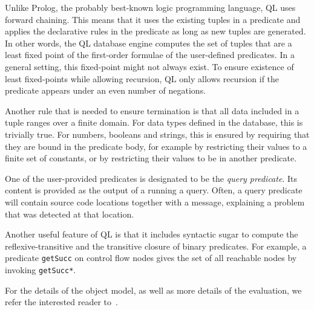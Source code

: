 Unlike Prolog, the probably best-known logic programming language, QL uses forward 
chaining.
This means that it uses the existing tuples in a predicate and applies the declarative
rules in the predicate as long as new tuples are generated.
In other words, the QL database engine computes the set of tuples that are a least fixed point 
of the first-order formulae of the user-defined predicates.
In a general setting, this fixed-point might not always exist.
To ensure existence of least fixed-points while allowing recursion,
QL only allows recursion if the predicate appears under an even number of negations.

Another rule that is needed to ensure termination is that all data included in a tuple 
ranges over a finite domain.
For data types defined in the database, this is trivially true.
For numbers, booleans and strings, this is ensured by requiring that they are bound 
in the predicate body, for example by restricting their values to a finite set of constants,
or by restricting their values to be in another predicate.

One of the user-provided predicates is designated to be the \emph{query predicate}.
Its content is provided as the output of a running a query.
Often, a query predicate will contain source code locations together with a message,
explaining a problem that was detected at that location.

Another useful feature of QL is that it includes syntactic sugar to compute the reflexive-transitive
and the transitive closure of binary predicates.
For example, a predicate \texttt{getSucc} on control flow nodes gives the set of all reachable
nodes by invoking \texttt{getSucc*}.

For the details of the object model, as well as more details of the evaluation, we refer
the interested reader to~\cite{qlpaper}.
